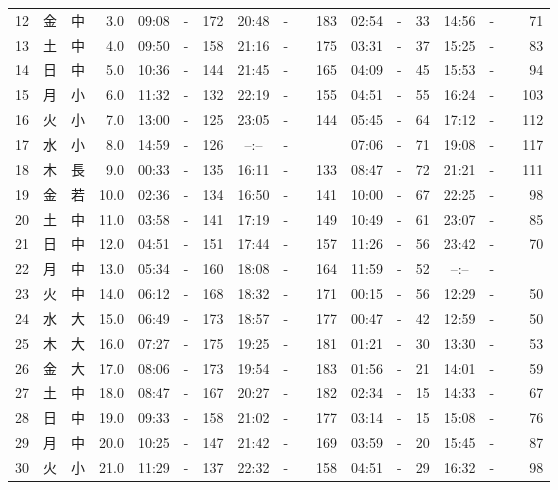 \documentclass[12pt.a4j]{jsarticle}
\begin{document}
\begin{center}
\begin{table}[ht]
\begin{tabular}{|rc|cr|ccrccr|ccrccr|}
12 & 金 & 中 &  3.0 &  09:08 &-& 172  &  20:48 &-& 183  &   02:54 &-&  33  &   14:56 &-&  71  \\
13 & 土 & 中 &  4.0 &  09:50 &-& 158  &  21:16 &-& 175  &   03:31 &-&  37  &   15:25 &-&  83  \\
14 & 日 & 中 &  5.0 &  10:36 &-& 144  &  21:45 &-& 165  &   04:09 &-&  45  &   15:53 &-&  94  \\
15 & 月 & 小 &  6.0 &  11:32 &-& 132  &  22:19 &-& 155  &   04:51 &-&  55  &   16:24 &-& 103  \\
16 & 火 & 小 &  7.0 &  13:00 &-& 125  &  23:05 &-& 144  &   05:45 &-&  64  &   17:12 &-& 112  \\
17 & 水 & 小 &  8.0 &  14:59 &-& 126  &  --:-- &-&~~~~~ &   07:06 &-&  71  &   19:08 &-& 117  \\
18 & 木 & 長 &  9.0 &  00:33 &-& 135  &  16:11 &-& 133  &   08:47 &-&  72  &   21:21 &-& 111  \\
19 & 金 & 若 & 10.0 &  02:36 &-& 134  &  16:50 &-& 141  &   10:00 &-&  67  &   22:25 &-&  98  \\
20 & 土 & 中 & 11.0 &  03:58 &-& 141  &  17:19 &-& 149  &   10:49 &-&  61  &   23:07 &-&  85  \\
21 & 日 & 中 & 12.0 &  04:51 &-& 151  &  17:44 &-& 157  &   11:26 &-&  56  &   23:42 &-&  70  \\
22 & 月 & 中 & 13.0 &  05:34 &-& 160  &  18:08 &-& 164  &   11:59 &-&  52  &   --:-- &-&~~~~~ \\
23 & 火 & 中 & 14.0 &  06:12 &-& 168  &  18:32 &-& 171  &   00:15 &-&  56  &   12:29 &-&  50  \\
24 & 水 & 大 & 15.0 &  06:49 &-& 173  &  18:57 &-& 177  &   00:47 &-&  42  &   12:59 &-&  50  \\
25 & 木 & 大 & 16.0 &  07:27 &-& 175  &  19:25 &-& 181  &   01:21 &-&  30  &   13:30 &-&  53  \\
26 & 金 & 大 & 17.0 &  08:06 &-& 173  &  19:54 &-& 183  &   01:56 &-&  21  &   14:01 &-&  59  \\
27 & 土 & 中 & 18.0 &  08:47 &-& 167  &  20:27 &-& 182  &   02:34 &-&  15  &   14:33 &-&  67  \\
28 & 日 & 中 & 19.0 &  09:33 &-& 158  &  21:02 &-& 177  &   03:14 &-&  15  &   15:08 &-&  76  \\
29 & 月 & 中 & 20.0 &  10:25 &-& 147  &  21:42 &-& 169  &   03:59 &-&  20  &   15:45 &-&  87  \\
30 & 火 & 小 & 21.0 &  11:29 &-& 137  &  22:32 &-& 158  &   04:51 &-&  29  &   16:32 &-&  98  \\

\end{tabular}
\end{table}
\end{center}
\end{document}
